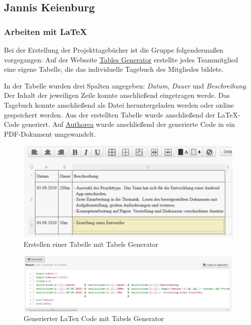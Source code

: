 \clearpage

\subsection{Jannis Keienburg}

\subsubsection{Arbeiten mit \LaTeX}

Bei der Erstellung der Projekttagebücher ist die Gruppe folgendermaßen vorgegangen: 
Auf der Webseite \hyperlink{www.tablesgenerator.com}{Tables Generator} erstellte jedes Teammitglied eine eigene Tabelle, die das individuelle Tagebuch des Mitgliedes bildete. 

In der Tabelle wurden drei Spalten angegeben: \textit{Datum}, \textit{Dauer} und \textit{Beschreibung}. Der Inhalt der jeweiligen Zeile konnte anschließend eingetragen werde. Das Tagebuch konnte anschließend als  Datei heruntergeladen werden oder online gespeichert werden. Aus der erstellten Tabelle wurde anschließend der \LaTeX-Code generiert. Auf \hyperlink{www.authorea.com}{Authorea} wurde anschließend der generierte Code in ein PDF-Dokument umgewandelt. 

\begin{figure}[!h]
	\includegraphics[scale=1]{img/tabels-generator-erstellen}
	\caption[Erstellen einer Tabelle mit Tabels Generator]{Erstellen einer Tabelle mit Tabels Generator\footnotemark}
\end{figure}
\FloatBarrier

\begin{figure}[!h]
	\includegraphics[scale=1]{img/tables-generator-generate}
	\caption[Generierter LaTex Code mit Tabels Generator]{Generierter LaTex Code mit Tabels Generator\footnotemark}
\end{figure}
\FloatBarrier

